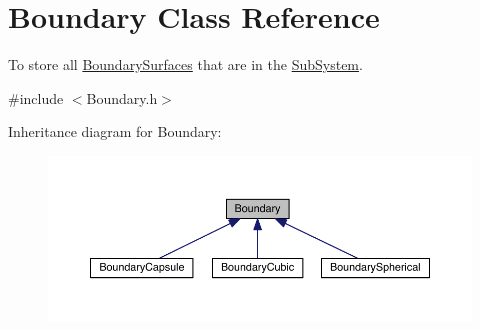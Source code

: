 \hypertarget{classBoundary}{\section{Boundary Class Reference}
\label{classBoundary}
}


To store all \hyperlink{classBoundarySurface}{Boundary\+Surfaces} that are in the \hyperlink{classSubSystem}{Sub\+System}.  




{\ttfamily \#include $<$Boundary.\+h$>$}



Inheritance diagram for Boundary\+:\nopagebreak
\begin{figure}[H]
\begin{center}
\leavevmode
\includegraphics[width=350pt]{classBoundary__inherit__graph}
\end{center}
\end{figure}


